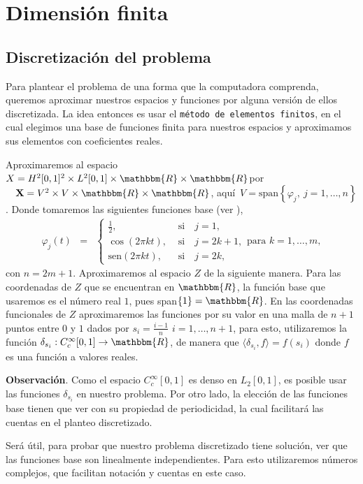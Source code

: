 \documentclass[a4paper,10pt]{book}
\newcommand{\R}{\mathbbm{R}}
\newcommand{\arr}{\rightarrow}
\newcommand{\la}{\langle}
\newcommand{\ra}{\rangle}
\begin{document}
\section{Dimensión finita}
\subsection{Discretización del problema}

Para plantear el problema de una forma que la computadora comprenda, queremos aproximar nuestros espacios y funciones por alguna versión de ellos discretizada. La idea entonces es usar el \texttt{método de elementos finitos}, en el cual elegimos una base de funciones finita para nuestros espacios y aproximamos sus elementos con coeficientes reales.

Aproximaremos al espacio 
$X=H^2[0,1]^2\times L^2[0,1]\times \R \times \R$\quad por $\quad\textbf{X}=V^2\times V\times \R\times \R$,
aquí $\, V=\mbox{span}\left\{\varphi_j,\ j=1,\ldots, n\right\}$.
Donde tomaremos las siguientes funciones base (ver \cite[Subsection 2.3.1]{stoer1993introduction}),
\begin{eqnarray*}\label{funbase}
\varphi_j(t)&=&\left\{ \begin{array}{ll}
\frac{1}{2}, & \mbox{ si}\quad j=1,\\
\cos(2\pi kt), & \mbox{ si}\quad j=2k+1,\\
\mathrm{sen}(2\pi kt), & \mbox{ si}\quad j=2k,
\end{array}
\right.\mbox{para } k=1,\ldots,m,
\end{eqnarray*}
con $n=2m+1$. Aproximaremos al espacio $Z$ de la siguiente manera.
Para las coordenadas de $Z$ que se encuentran en $\R$, la función base que usaremos es el número real $1$, pues span$\{1\}=\R$. En las coordenadas funcionales de $Z$ aproximaremos las funciones por su valor en una malla de $n+1$ puntos entre $0$ y $1$ dados por $s_i=\frac{i-1}{n}$ $i=1,\ldots,n+1$, para esto, utilizaremos la función $\delta_{s_i}:C_c^\infty[0,1]\arr\R$, de manera que $\la\delta_{s_i},f\ra=f(s_i)$ donde $f$ es una función a valores reales.

\textbf{Observación}. Como el espacio $C_c^\infty[0,1]$ es denso en $L_2[0,1]$, es posible usar las funciones $\delta_{s_i}$ en nuestro problema.
Por otro lado, la elección de las funciones base tienen que ver con su propiedad de periodicidad, la cual facilitará las cuentas en el planteo discretizado.

Será útil, para probar que nuestro problema discretizado tiene solución, ver que las funciones base son linealmente independientes. Para esto utilizaremos números complejos, que facilitan notación y cuentas en este caso.
\end{document}
